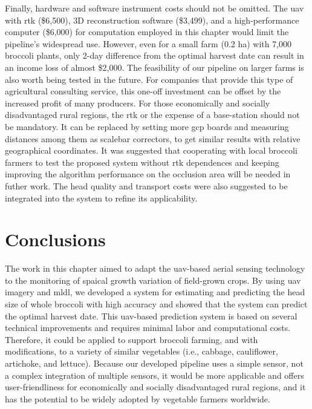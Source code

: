 Finally, hardware and software instrument costs should not be omitted. The \gls{uav} with \gls{rtk} (\$6,500), 3D reconstruction software (\$3,499), and a high-performance computer (\$6,000) for computation employed in this chapter would limit the pipeline's widespread use. However, even for a small farm (0.2 ha) with 7,000 broccoli plants, only 2-day difference from the optimal harvest date can result in an income loss of almost \$2,000. The feasibility of our pipeline on larger farms is also worth being tested in the future. For companies that provide this type of agricultural consulting service, this one-off investment can be offset by the increased profit of many producers. For those economically and socially disadvantaged rural regions, the \gls{rtk} or the expense of a base-station should not be mandatory. It can be replaced by setting more \gls{gcp} boards and measuring distances among them as scalebar correctors, to get similar results with relative geographical coordinates. It was suggested that cooperating with local broccoli farmers to test the proposed system without \gls{rtk} dependences and keeping improving the algorithm performance on the occlusion area will be needed in futher work. The head quality and transport costs were also suggested to be integrated into the system to refine its applicability.

\section{Conclusions}

The work in this chapter aimed to adapt the \gls{uav}-based aerial sensing technology to the monitoring of spaical growth variation of field-grown crops. By using \gls{uav} imagery and \gls{mldl}, we developed a system for estimating and predicting the head size of whole broccoli with high accuracy and showed that the system can predict the optimal harvest date. This \gls{uav}-based prediction system is based on several technical improvements and requires minimal labor and computational costs. Therefore, it could be applied to support broccoli farming, and with modifications, to a variety of similar vegetables (i.e., cabbage, cauliflower, artichoke, and lettuce). Because our developed pipeline uses a simple sensor, not a complex integration of multiple sensors, it would be more applicable and offers user-friendliness for economically and socially disadvantaged rural regions, and it has the potential to be widely adopted by vegetable farmers worldwide.

